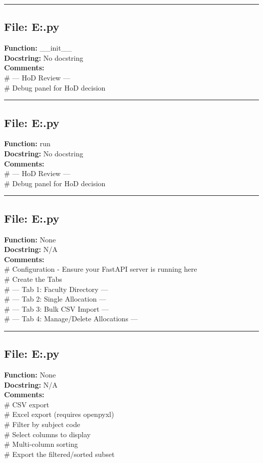 {\hrule

\subsection*{File: E:\project\capstone\frontend\hod\decision.py}
\textbf{Function:} __init__\\
\textbf{Docstring:} No docstring\\
\textbf{Comments:}\\
# --- HoD Review ---\\
# Debug panel for HoD decision\\

\hrule

\subsection*{File: E:\project\capstone\frontend\hod\decision.py}
\textbf{Function:} run\\
\textbf{Docstring:} No docstring\\
\textbf{Comments:}\\
# --- HoD Review ---\\
# Debug panel for HoD decision\\

\hrule

\subsection*{File: E:\project\capstone\frontend\hod\FS.py}
\textbf{Function:} None\\
\textbf{Docstring:} N/A\\
\textbf{Comments:}\\
# Configuration - Ensure your FastAPI server is running here\\
# Create the Tabs\\
# --- Tab 1: Faculty Directory ---\\
# --- Tab 2: Single Allocation ---\\
# --- Tab 3: Bulk CSV Import ---\\
# --- Tab 4: Manage/Delete Allocations ---\\

\hrule

\subsection*{File: E:\project\capstone\frontend\hod\Tm.py}
\textbf{Function:} None\\
\textbf{Docstring:} N/A\\
\textbf{Comments:}\\
# CSV export\\
# Excel export (requires openpyxl)\\
# Filter by subject code\\
# Select columns to display\\
# Multi-column sorting\\
# Export the filtered/sorted subset\\

}
